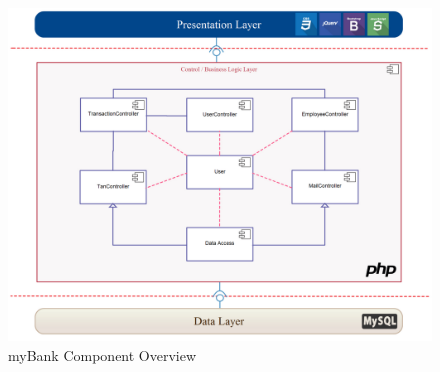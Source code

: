 \begin{center}
\begin{figure}[hbtp]
        \centering
        \includegraphics[width=1.0\linewidth]{architecture}
        \caption{myBank Component Overview}\label{architecture}
\end{figure}
\end{center}

